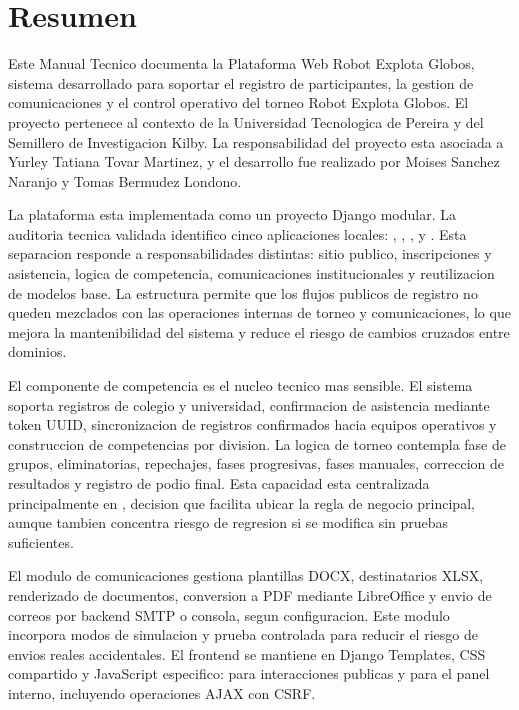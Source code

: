 \chapter*{Resumen}

Este Manual Tecnico documenta la Plataforma Web Robot Explota Globos, sistema desarrollado para soportar el registro de participantes, la gestion de comunicaciones y el control operativo del torneo Robot Explota Globos. El proyecto pertenece al contexto de la Universidad Tecnologica de Pereira y del Semillero de Investigacion Kilby. La responsabilidad del proyecto esta asociada a Yurley Tatiana Tovar Martinez, y el desarrollo fue realizado por Moises Sanchez Naranjo y Tomas Bermudez Londono.

La plataforma esta implementada como un proyecto Django modular. La auditoria tecnica validada identifico cinco aplicaciones locales: , , ,  y . Esta separacion responde a responsabilidades distintas: sitio publico, inscripciones y asistencia, logica de competencia, comunicaciones institucionales y reutilizacion de modelos base. La estructura permite que los flujos publicos de registro no queden mezclados con las operaciones internas de torneo y comunicaciones, lo que mejora la mantenibilidad del sistema y reduce el riesgo de cambios cruzados entre dominios.

El componente de competencia es el nucleo tecnico mas sensible. El sistema soporta registros de colegio y universidad, confirmacion de asistencia mediante token UUID, sincronizacion de registros confirmados hacia equipos operativos y construccion de competencias por division. La logica de torneo contempla fase de grupos, eliminatorias, repechajes, fases progresivas, fases manuales, correccion de resultados y registro de podio final. Esta capacidad esta centralizada principalmente en , decision que facilita ubicar la regla de negocio principal, aunque tambien concentra riesgo de regresion si se modifica sin pruebas suficientes.

El modulo de comunicaciones gestiona plantillas DOCX, destinatarios XLSX, renderizado de documentos, conversion a PDF mediante LibreOffice y envio de correos por backend SMTP o consola, segun configuracion. Este modulo incorpora modos de simulacion y prueba controlada para reducir el riesgo de envios reales accidentales. El frontend se mantiene en Django Templates, CSS compartido y JavaScript especifico:  para interacciones publicas y  para el panel interno, incluyendo operaciones AJAX con CSRF.


